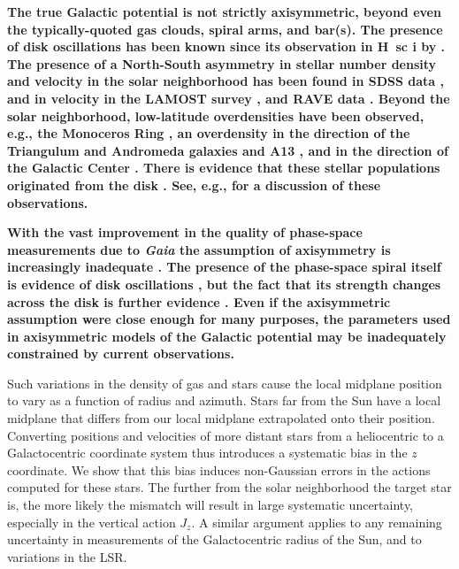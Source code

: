 \documentclass[twocolumn]{aastex62}
\begin{document}
\textbf{The true Galactic potential is not strictly axisymmetric, beyond even
the typically-quoted gas clouds, spiral arms, and bar(s). The presence of disk
oscillations has been known
    since its observation in H~{sc i} by \citet{1957AJ.....62...93K}.
The presence of a North-South
asymmetry in stellar number density and velocity in the solar neighborhood has
been found in
SDSS data \citep{2012ApJ...750L..41W}, and in velocity in the
LAMOST survey \citep{2013ApJ...777L...5C}, and RAVE data
\citep{2013MNRAS.436..101W}. Beyond the solar neighborhood, low-latitude
overdensities have been observed, e.g., the Monoceros Ring
\citep{2002ApJ...569..245N, 2003MNRAS.340L..21I, 2003ApJ...594L.119C,
2014ApJ...791....9S, 2016ApJ...825..140M}, an overdensity in the direction of
the Triangulum and Andromeda galaxies \citep{2007ApJ...668L.123M,
2014ApJ...793...62S, 2015ApJ...801..105X, 2015MNRAS.452..676P} and A13
\citep{2010ApJ...722..750S, 2017ApJ...844...74L}, and in the direction of the
Galactic Center \citep{2014Natur.509..342F}. There is evidence that these
stellar populations originated from the disk \citep{2018ApJ...854...47S,
2018Natur.555..334B}. See, e.g., \citet{2018MNRAS.481..286L} for a discussion
of these observations.}

\textbf{With the vast improvement in the quality of phase-space measurements
due to \textit{Gaia} the assumption of axisymmetry is increasingly inadequate
\citep[e.g.,][]{2018Natur.561..360A, 2019MNRAS.485.3134L}. The presence of the
phase-space spiral itself is evidence of disk oscillations
\citep{2018Natur.561..360A}, but the fact that its strength changes across the
disk is further evidence \citep{2019MNRAS.486.1167B}. Even if the axisymmetric
assumption were close enough for many purposes, the parameters used in
axisymmetric models of the Galactic potential may be inadequately constrained
by current observations.}

     Such
variations in the density of gas and stars cause the local
midplane position to vary as a function of radius and azimuth. Stars far from
the Sun have a local midplane that differs from our local midplane
extrapolated onto their position. Converting positions and velocities of more
distant stars from a heliocentric to a Galactocentric coordinate system thus
introduces a systematic bias in the $z$ coordinate. We show that this bias
induces non-Gaussian errors in the actions computed for these stars. The
further from the solar neighborhood the target star is, the more likely the
mismatch will result in large systematic uncertainty, especially in the
vertical action $J_z$. A similar argument applies to any remaining uncertainty
in measurements of the Galactocentric radius of the Sun, and to variations in
the LSR.
\end{document}

